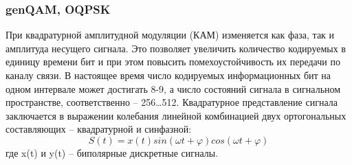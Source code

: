 \subsubsection{genQAM, OQPSK}
При квадратурной амплитудной модуляции (КАМ) изменяется как фаза, так и амплитуда несущего сигнала. Это позволяет увеличить количество кодируемых в единицу времени бит и при этом повысить помехоустойчивость их передачи по каналу связи. В настоящее время число кодируемых информационных бит на одном интервале может достигать 8-9, а число состояний сигнала в сигнальном пространстве, соответственно – 256…512.
Квадратурное представление сигнала заключается в выражении колебания линейной комбинацией двух ортогональных составляющих – квадратурной и синфазной:
\begin{equation}
	S(t) = x(t) sin(\omega t + \varphi) cos(\omega t + \varphi)
\end{equation}
где x(t) и y(t) – биполярные дискретные сигналы.

